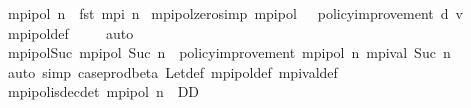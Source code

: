 \begin{isabellebody}
\isamarkupfalse%
\ {\isachardoublequoteopen}mpi{\isacharunderscore}{\kern0pt}pol\ n\ {\isacharequal}{\kern0pt}\ fst\ {\isacharparenleft}{\kern0pt}mpi\ n{\isacharparenright}{\kern0pt}{\isachardoublequoteclose}\isanewline
\isanewline
{}\isamarkupfalse%
\ mpi{\isacharunderscore}{\kern0pt}pol{\isacharunderscore}{\kern0pt}zero{\isacharbrackleft}{\kern0pt}simp{\isacharbrackright}{\kern0pt}{\isacharcolon}{\kern0pt}\ {\isachardoublequoteopen}mpi{\isacharunderscore}{\kern0pt}pol\ {}\ {\isacharequal}{\kern0pt}\ policy{\isacharunderscore}{\kern0pt}improvement\ d{}\ v{}{\isachardoublequoteclose}\isanewline
%
\isadelimproof
\ \ %
\endisadelimproof
%
\isatagproof
{}\isamarkupfalse%
\ mpi{\isacharunderscore}{\kern0pt}pol{\isacharunderscore}{\kern0pt}def\ \isanewline
\ \ \isamarkupfalse%
\ auto%
\endisatagproof
{\isafoldproof}%
%
\isadelimproof
\isanewline
%
\endisadelimproof
\isanewline
{}\isamarkupfalse%
\ mpi{\isacharunderscore}{\kern0pt}pol{\isacharunderscore}{\kern0pt}Suc{\isacharcolon}{\kern0pt}\ {\isachardoublequoteopen}mpi{\isacharunderscore}{\kern0pt}pol\ {\isacharparenleft}{\kern0pt}Suc\ n{\isacharparenright}{\kern0pt}\ {\isacharequal}{\kern0pt}\ policy{\isacharunderscore}{\kern0pt}improvement\ {\isacharparenleft}{\kern0pt}mpi{\isacharunderscore}{\kern0pt}pol\ n{\isacharparenright}{\kern0pt}\ {\isacharparenleft}{\kern0pt}mpi{\isacharunderscore}{\kern0pt}val\ {\isacharparenleft}{\kern0pt}Suc\ n{\isacharparenright}{\kern0pt}{\isacharparenright}{\kern0pt}{\isachardoublequoteclose}\isanewline
%
\isadelimproof
\ \ %
\endisadelimproof
%
\isatagproof
{}\isamarkupfalse%
\ {\isacharparenleft}{\kern0pt}auto\ simp{\isacharcolon}{\kern0pt}\ case{\isacharunderscore}{\kern0pt}prod{\isacharunderscore}{\kern0pt}beta{\isacharprime}{\kern0pt}\ Let{\isacharunderscore}{\kern0pt}def\ mpi{\isacharunderscore}{\kern0pt}pol{\isacharunderscore}{\kern0pt}def\ mpi{\isacharunderscore}{\kern0pt}val{\isacharunderscore}{\kern0pt}def{\isacharparenright}{\kern0pt}%
\endisatagproof
{\isafoldproof}%
%
\isadelimproof
\isanewline
%
\endisadelimproof
\isanewline
{}\isamarkupfalse%
\ mpi{\isacharunderscore}{\kern0pt}pol{\isacharunderscore}{\kern0pt}is{\isacharunderscore}{\kern0pt}dec{\isacharunderscore}{\kern0pt}det{\isacharcolon}{\kern0pt}\ {\isachardoublequoteopen}mpi{\isacharunderscore}{\kern0pt}pol\ n\ {\isasymin}\ D\isactrlsub D{\isachardoublequoteclose}\isanewline
%
\isadelimproof
\ \ %
\endisadelimproof
%
\isatagproof
{}\isamarkupfalse%

\end{isabellebody}

